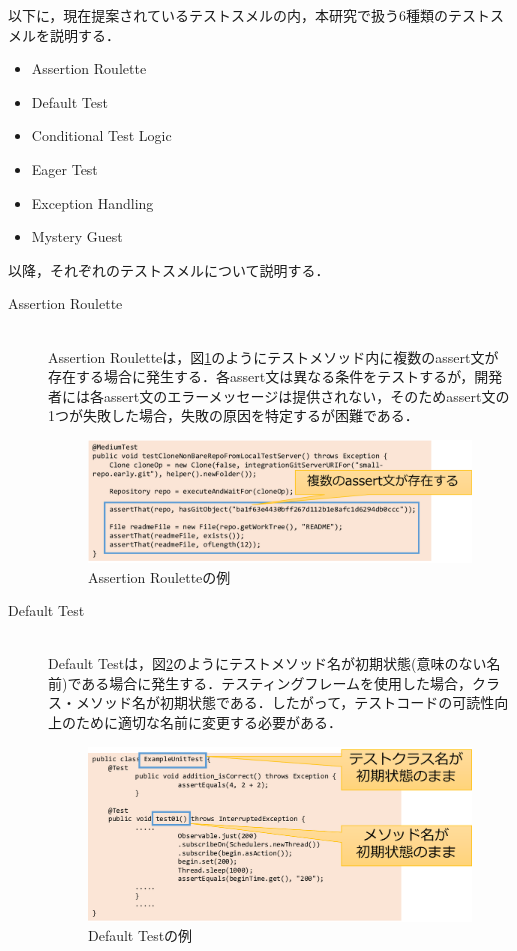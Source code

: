 \documentclass[12pt]{jarticle} %
\begin{document}
以下に，現在提案されているテストスメルの内，本研究で扱う6種類のテストスメルを説明する．

\begin{itemize}
\item Assertion Roulette
\item Default Test
\item Conditional Test Logic
\item Eager Test
\item Exception Handling
\item Mystery Guest
\end{itemize}

以降，それぞれのテストスメルについて説明する．

\begin{description}
\item[Assertion Roulette]~\\
Assertion Rouletteは，図\ref{AR}のようにテストメソッド内に複数のassert文が存在する場合に発生する．各assert文は異なる条件をテストするが，開発者には各assert文のエラーメッセージは提供されない，そのためassert文の1つが失敗した場合，失敗の原因を特定するが困難である．

\begin{figure}[h]
\begin{center}
\includegraphics[clip,width=15cm]{AR.pdf}
\caption{Assertion Rouletteの例}
\label{AR}
\end{center}
\end{figure}

\item[Default Test]~\\
Default Testは，図\ref{DT}のようにテストメソッド名が初期状態(意味のない名前)である場合に発生する．テスティングフレームを使用した場合，クラス・メソッド名が初期状態である．したがって，テストコードの可読性向上のために適切な名前に変更する必要がある．


\begin{figure}[h]
\begin{center}
\includegraphics[clip,width=15cm]{DT.pdf}
\caption{Default Testの例}
\label{DT}
\end{center}
\end{figure}


\end{description}
\end{document}
